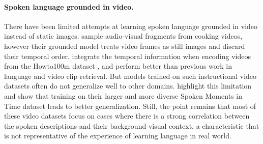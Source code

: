 \paragraph{Spoken language grounded in video.}
There have been limited attempts at learning spoken language grounded
in video instead of static images.  \citet{boggust2019grounding}
sample audio-visual fragments from cooking videos, however their
grounded model treats video frames as still images and discard their
temporal order.
\citet{rouditchenko2020avlnet} integrate the temporal information when
encoding videos from the Howto100m dataset \cite{miech2019howto100m},
and perform better than previous work in language and video clip
retrieval.
But models trained on such instructional video datasets often do not
generalize well to other domains. \citet{monfort2021spokenmoments}
highlight this limitation and show that training on their larger and
more diverse Spoken Moments in Time dataset leads to better
generalization.  Still, the point remains that most of these video
datasets focus on cases where there is a strong correlation between
the spoken descriptions and their background visual context, a
characteristic that is not representative of the experience of
learning language in real world.

